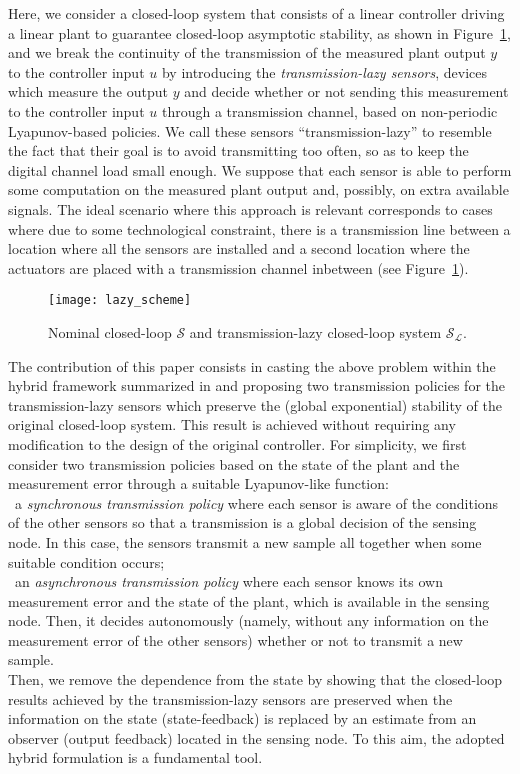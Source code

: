 \documentclass[twocolumn]{autart}
\begin{document}
Here, we consider a closed-loop system that consists of
a linear controller driving a linear plant to guarantee
closed-loop asymptotic stability, as shown in Figure~\ref{fig:SL},
and we break the continuity of the transmission of the measured
plant output $y$ to the controller input $u$ by 
introducing the \emph{transmission-lazy sensors}, devices which
measure the output $y$ and decide whether or not sending
this measurement to the controller input $u$ through a transmission channel, based on non-periodic
Lyapunov-based policies. We call these sensors ``transmission-lazy'' to 
resemble the fact that their goal is to avoid transmitting too often,
so as to keep the digital channel load small enough.
We suppose that each sensor is able to perform some computation
on the measured plant output and, possibly,
on extra available signals.
{
The ideal scenario where this approach is relevant corresponds to
cases where due to some technological constraint, there is a
transmission line between a location where all the sensors are
installed and a second location where the actuators are placed
with a transmission channel inbetween (see Figure~\ref{fig:SL}).}


\begin{figure}[ht!]
\centering
\texttt{[image: lazy\_scheme]}
 	\caption{Nominal closed-loop $\mathcal{S}$ and 
transmission-lazy closed-loop system $\mathcal{S}_{\mathcal{L}}$.}
 	\label{fig:SL}
\end{figure}
The contribution of this paper consists in casting 
the above problem within the hybrid framework summarized in \cite{GoebelCSM09}
and proposing two transmission policies for the transmission-lazy sensors
which preserve the (global exponential) stability of the original closed-loop
system. { This result is achieved without requiring any modification
to the design of the original controller}. 
For simplicity, we first consider two transmission 
policies based on the state of the plant and the
measurement error through a suitable Lyapunov-like function:\\
\textbullet~a \emph{synchronous transmission policy} 
 where each sensor is aware of the conditions
 of the other sensors so that a transmission 
 is a global decision { of the sensing node}. In this case, the sensors 
 transmit a new sample all together when some suitable condition occurs;\\
\textbullet~an \emph{asynchronous transmission policy} 
 where each sensor knows its own measurement error and the state of
 the plant, { which is available in the sensing node}. Then,
 it decides autonomously { (namely, without any information on the measurement 
 error of the  other sensors) } whether or not to transmit a new sample.\\
Then, we remove the dependence from the state by showing that the closed-loop
results achieved by the transmission-lazy sensors are preserved when the information
on the state (state-feedback) is replaced by an estimate 
from an observer (output feedback) { located in the sensing
  node.
To this aim, the adopted hybrid formulation is a fundamental tool.} 
\end{document}
